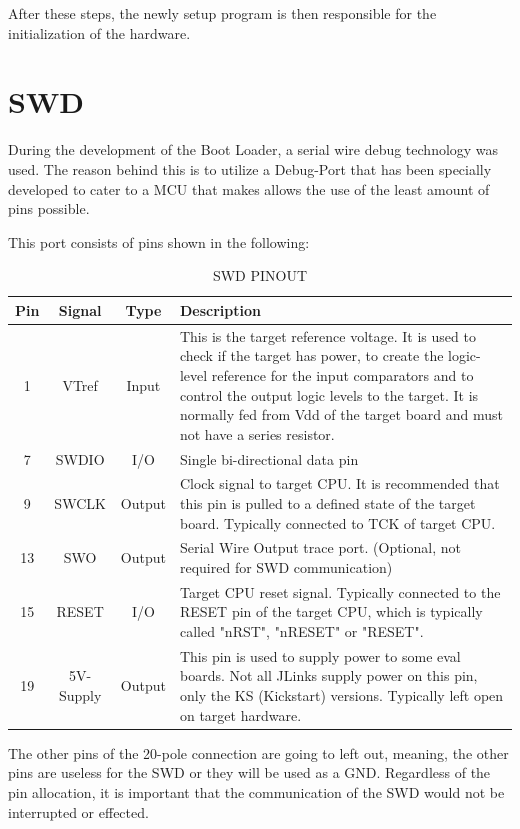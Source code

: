 After these steps, the newly setup program is then responsible for the initialization
of the hardware.\\

\section{SWD}
During the development of the Boot Loader, a serial wire debug technology was used.
The reason behind this is to utilize a Debug-Port that has been specially developed to
cater to a MCU that makes allows the use of the least amount of pins possible.

This port consists of pins shown in the following:

\begin{table}[ht]
	\centering
	\begin{tabular}{|c|c|c|p{10cm}|}
		\hline \hline
		Pin & Signal & Type & Description \\ \hline
		1 & VTref & Input & This is the target reference voltage. It is used to
		check if the target has power, to create the logic-level reference for
		the input comparators and to control the output logic levels to the target.
		It is normally fed from Vdd of the target board and must not have a series resistor.\\ \hline
		7 & SWDIO & I/O & Single bi-directional data pin\\ \hline
		9 & SWCLK & Output & Clock signal to target CPU. It is recommended that
		this pin is pulled to a defined state of the target board. Typically
		connected to TCK of target CPU.\\ \hline
		13 & SWO & Output & Serial Wire Output trace port. (Optional, not required
		for SWD communication)\\ \hline
		15 & RESET & I/O & Target CPU reset signal. Typically connected to the
		RESET pin of the target CPU, which is typically called "nRST", "nRESET"
		or "RESET".\\ \hline
		19 & 5V-Supply & Output & This pin is used to supply power to some eval boards.
		Not all JLinks supply power on this pin, only the KS (Kickstart) versions.
		Typically left open on target hardware.\\ \hline
\end{tabular}
\caption{SWD PINOUT}
\end{table}

The other pins of the 20-pole connection are going to left out, meaning, the other
pins are useless for the SWD or they will be used as a GND. Regardless of the pin allocation,
it is important that the communication of the SWD would not be interrupted or effected.

